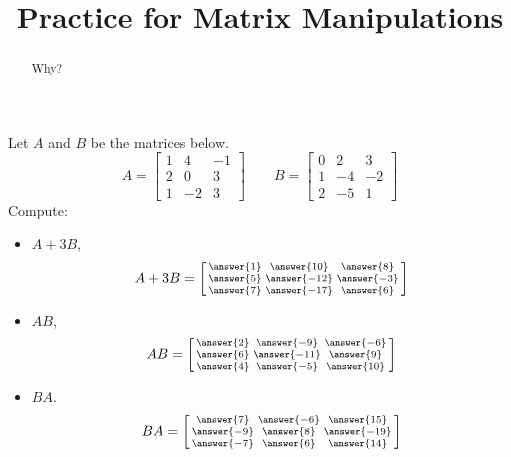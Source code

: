 \documentclass{ximera}
\title{Practice for Matrix Manipulations}
\begin{document}
\begin{abstract}
Why?
\end{abstract}
\maketitle


\begin{exercise}
    Let $A$ and $B$ be the matrices below.
    \[ 
        A = 
        \begin{bmatrix} 
            1 & 4 & -1 \\ 
            2 & 0 & 3 \\
            1 & -2 & 3 
        \end{bmatrix} 
        \qquad B = 
        \begin{bmatrix} 
            0 & 2 & 3 \\ 
            1 & -4 & -2 \\ 
            2 & -5 & 1 
        \end{bmatrix} 
    \]
    Compute: 
    \begin{itemize}
        \item $A + 3B$, 
            \[
                A+3B = \left[\begin{smallmatrix} \answer{1} & \answer{10} & \answer{8} \\ \answer{5} & \answer{-12} & \answer{-3} \\ \answer{7} & \answer{-17} & \answer{6} \end{smallmatrix}\right]
            \]
        \item $AB$, 
            \[
                AB = \left[\begin{smallmatrix}  \answer{2} & \answer{-9} & \answer{-6} \\ \answer{6} & \answer{-11} & \answer{9} \\ \answer{4} & \answer{-5} & \answer{10} \end{smallmatrix}\right]
            \]
        \item $BA$.
            \[
                BA = \left[\begin{smallmatrix} \answer{7} & \answer{-6} & \answer{15} \\ \answer{-9} & \answer{8} & \answer{-19} \\ \answer{-7} & \answer{6} & \answer{14} \end{smallmatrix}\right]
            \] 
    \end{itemize}
\end{exercise}
\end{document}
